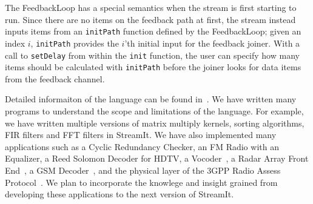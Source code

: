 The FeedbackLoop has a special semantics when the stream is first
starting to run.  Since there are no items on the feedback path at
first, the stream instead inputs items from an {\tt initPath} function
defined by the FeedbackLoop; given an index $i$, {\tt initPath}
provides the $i$'th initial input for the feedback joiner.  With a
call to {\tt setDelay} from within the {\tt init} function, the user
can specify how many items should be calculated with {\tt initPath}
before the joiner looks for data items from the feedback channel.


Detailed informaiton of the language can be found
in~\cite{streamitcc}. We have written many programs to understand the
scope and limitations of the language. For example, we have written
multiple versions of matrix multiply kernels, sorting algorithms, FIR
filters and FFT filters in StreamIt. We have also implemented many
applications such as a Cyclic Redundancy Checker, an FM Radio with an
Equalizer, a Reed Solomon Decoder for HDTV, a Vocoder~\cite{seneff80},
a Radar Array Front End~\cite{pca}, a GSM Decoder~\cite{gsm}, and the physical
layer of the 3GPP Radio Assess Protocol~\cite{3gpp}.  We plan to
incorporate the knowlege and insight grained from developing these
applications to the next version of StreamIt.
